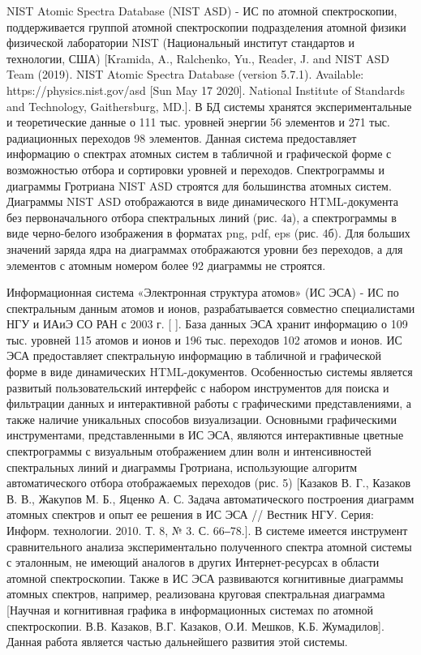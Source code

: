 \documentclass[a4paper, 12pt]{article}
\begin{document}
    NIST Atomic Spectra Database (NIST ASD) - ИС по атомной спектроскопии, поддерживается группой атомной спектроскопии подразделения атомной физики физической лаборатории NIST (Национальный институт стандартов и технологии, США) [Kramida, A., Ralchenko, Yu., Reader, J. and NIST ASD Team (2019). NIST Atomic Spectra Database (version 5.7.1). Available: https://physics.nist.gov/asd [Sun May 17 2020]. National Institute of Standards and Technology, Gaithersburg, MD.]. В БД системы хранятся экспериментальные и теоретические данные о 111 тыс. уровней энергии 56 элементов и 271 тыс. радиационных переходов 98 элементов. Данная система предоставляет информацию о спектрах атомных систем в табличной и графической форме с возможностью отбора и сортировки уровней и переходов.  Спектрограммы и диаграммы Гротриана NIST ASD строятся для большинства атомных систем. Диаграммы NIST ASD отображаются в виде динамического HTML-документа без первоначального отбора спектральных линий (рис. 4а), а спектрограммы в виде черно-белого изображения в форматах png, pdf, eps (рис. 4б). Для больших значений заряда ядра на диаграммах отображаются уровни без переходов, а для элементов с атомным номером более 92 диаграммы не строятся.\par
    Информационная система «Электронная структура атомов» (ИС ЭСА) - ИС по спектральным данным атомов и ионов, разрабатывается совместно специалистами НГУ и ИАиЭ СО РАН с 2003 г. [ ]. База данных ЭСА хранит информацию о 109 тыс. уровней 115 атомов и ионов и 196 тыс. переходов 102 атомов и ионов. ИС ЭСА предоставляет спектральную информацию в табличной и графической форме в виде динамических HTML-документов. Особенностью системы является развитый пользовательский интерфейс с набором инструментов для поиска и фильтрации данных и интерактивной работы с графическими представлениями, а также наличие уникальных способов визуализации. Основными графическими инструментами, представленными в ИС ЭСА, являются интерактивные цветные спектрограммы с визуальным отображением длин волн и интенсивностей спектральных линий и диаграммы Гротриана, использующие алгоритм автоматического отбора отображаемых переходов (рис. 5) [Казаков В. Г., Казаков В. В., Жакупов М. Б., Яценко А. С. Задача автоматического построения диаграмм атомных спектров и опыт ее решения в ИС ЭСА // Вестник НГУ. Серия: Информ. технологии. 2010. Т. 8, № 3. С. 66‒78.]. В системе имеется инструмент сравнительного анализа экспериментально полученного спектра атомной системы с эталонным, не имеющий аналогов в других Интернет-ресурсах в области атомной спектроскопии. Также в  ИС ЭСА развиваются когнитивные диаграммы атомных спектров, например, реализована круговая спектральная диаграмма [Научная и когнитивная графика в информационных системах по атомной спектроскопии. В.В. Казаков, В.Г. Казаков, О.И. Мешков, К.Б. Жумадилов]. Данная работа является частью дальнейшего развития этой системы.
    
\end{document}
